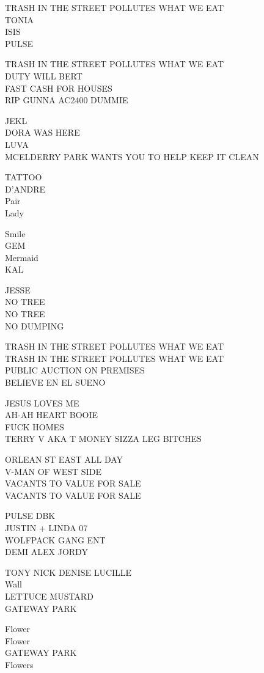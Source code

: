 \documentclass[10pt,letterpaper]{article}
\begin{document}
TRASH IN THE STREET POLLUTES WHAT WE EAT\\
TONIA\\
ISIS\\
PULSE

TRASH IN THE STREET POLLUTES WHAT WE EAT\\
DUTY WILL BERT\\
FAST CASH FOR HOUSES\\
RIP GUNNA AC2400 DUMMIE

JEKL\\
DORA WAS HERE\\
LUVA\\
MCELDERRY PARK WANTS YOU TO HELP KEEP IT CLEAN

TATTOO\\
D'ANDRE\\
Pair\\
Lady

Smile\\
GEM\\
Mermaid\\
KAL

JESSE\\
NO TREE\\
NO TREE\\
NO DUMPING

TRASH IN THE STREET POLLUTES WHAT WE EAT\\
TRASH IN THE STREET POLLUTES WHAT WE EAT\\
PUBLIC AUCTION ON PREMISES\\
BELIEVE EN EL SUENO

JESUS LOVES ME\\
AH{-}AH HEART BOOIE\\
FUCK HOMES\\
TERRY V AKA T MONEY SIZZA LEG BITCHES

ORLEAN ST EAST ALL DAY\\
V{-}MAN OF WEST SIDE\\
VACANTS TO VALUE FOR SALE\\
VACANTS TO VALUE FOR SALE

PULSE DBK\\
JUSTIN + LINDA 07\\
WOLFPACK GANG ENT\\
DEMI ALEX JORDY

TONY NICK DENISE LUCILLE\\
Wall\\
LETTUCE MUSTARD\\
GATEWAY PARK

Flower\\
Flower\\
GATEWAY PARK\\
Flowers
\end{document}
